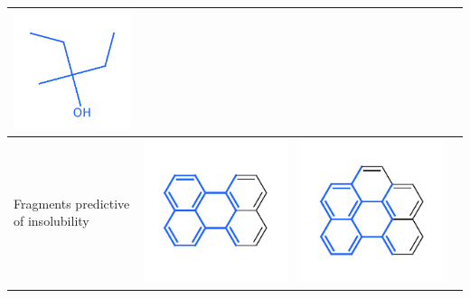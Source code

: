 \documentclass[landscape,a0b,final,a4resizeable]{include/a0poster}
\begin{document}
\begin{poster}
\begin{multicols}{3}
\begin{center}
\begin{tabular}{>{\centering}m{\mywidthb} >{\centering}m{\mywidtha} >{\centering}m{\mywidtha} >{\centering\arraybackslash}m{\mywidtha}}
\includegraphics[width=6cm, clip, trim = 2mm 3mm 2mm 6mm]{figures/fig_7.pdf} \\
\midrule
Fragments predictive of insolubility & 
\includegraphics[width=\mywidtha, clip, trim = 2mm 3mm 2mm 6mm]{figures/fig_8.pdf} &
\includegraphics[width=\mywidtha, clip, trim = 2mm 3mm 2mm 6mm]{figures/fig_9.pdf} &

\end{tabular}
\end{center}
\end{multicols}
\end{poster}
\end{document}
